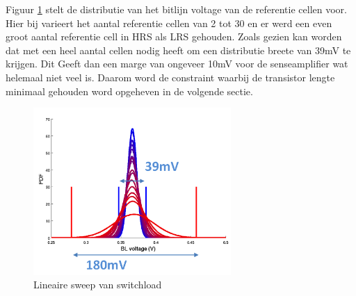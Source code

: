 Figuur \ref{fig:distref} stelt de distributie van het bitlijn voltage van de referentie cellen voor. Hier bij varieert het aantal referentie cellen van 2 tot 30 en er werd een even groot aantal referentie cell in HRS als LRS gehouden. Zoals gezien kan worden dat met een heel aantal cellen nodig heeft om een distributie breete van 39mV te krijgen. Dit Geeft dan een marge van ongeveer 10mV voor de senseamplifier wat helemaal niet veel is. Daarom word de constraint waarbij de transistor lengte minimaal gehouden word opgeheven in de volgende sectie.

\begin{figure}[!h]
  \centering
  \includegraphics[width=0.67\textwidth]{../fig/hfdst-last-ref.png}
  \caption{Lineaire sweep van switchload}
  \label{fig:distref}
\end{figure}


